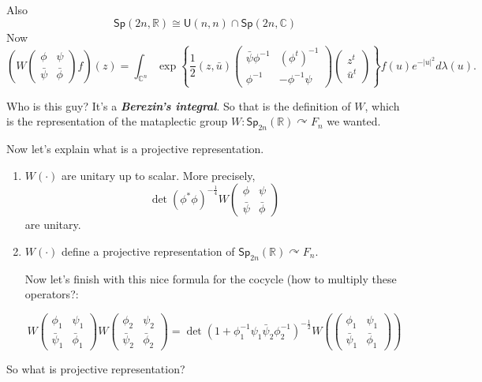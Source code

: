 Also 
\[\mathsf{Sp}(2n,\mathbb{R})\cong \mathsf{U}(n,n) \cap \mathsf{Sp}(2n,\mathbb{C})\]
Now
\[\left(W\begin{pmatrix} \phi&\psi\\\bar{\psi} &\bar{\phi}  \end{pmatrix} f\right)(z)=\int_{\mathbb{C}^{n}}\operatorname{exp} \left\{ \frac{1}{2}(z,\bar{u} )\begin{pmatrix} \bar{\psi} \phi^{-1}&(\phi^t)^{-1}\\\phi^{-1}&-\phi^{-1}\psi \end{pmatrix} \begin{pmatrix} z^t\\\bar{u} ^t \end{pmatrix}  \right\} f(u)e^{-|u|^2}d \lambda(u).\]

{\color{8}Who is this guy?} It's a \textit{\textbf{Berezin's integral}}. So that is the definition of $W$, which is the representation of the mataplectic group $W:\mathsf{Sp}_{2n}(\mathbb{R})\curvearrowright F_n$ we wanted.

Now let's explain what is a projective representation.

\begin{thm}\leavevmode
\begin{enumerate}

	\item 
$W(\cdot )$ are unitary up to scalar. More precisely,
	\[\det (\phi^*\phi)^{-\frac{1}{4}} W \begin{pmatrix} \phi&\psi\\\bar{\psi} &\bar{\phi}  \end{pmatrix} \]
	are unitary.

	\item $W(\cdot )$ define a projective representation of $\mathsf{Sp}_{2n}(\mathbb{R})\curvearrowright F_n$.

		Now let's finish with this nice formula for the cocycle (how to multiply these operators?:

	\[W \begin{pmatrix} \phi_1 &\psi_1\\\bar{\psi}_1 &\bar{\phi}_1 \end{pmatrix}W \begin{pmatrix} \phi_2&\psi_2\\\bar{\psi}_2&\bar{\phi}_2  \end{pmatrix} =\det (1+\phi_1^{-1}\psi_1\bar{\psi}_2\phi_2^{-1})^{-\frac{1}{2}} W\left( \begin{pmatrix} \phi_1&\psi_1\\\bar{\psi}_1&\bar{\phi}_1   \end{pmatrix}  \right)  \]
\end{enumerate}	\end{thm}

\begin{question}[Dani]\leavevmode
	So what is projective representation?
\end{question}














